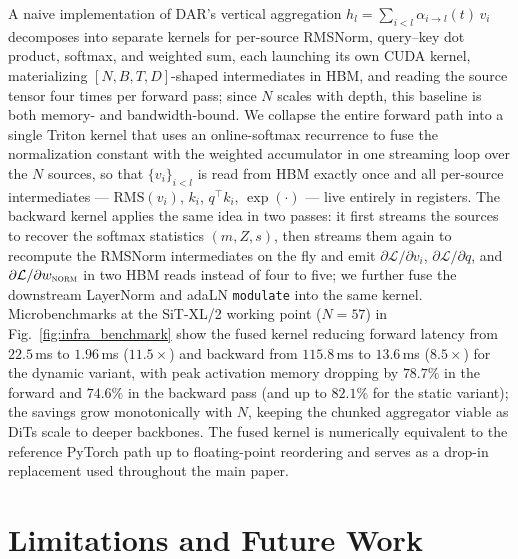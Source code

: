 \documentclass[]{ant_tech_report}
\begin{document}
A naive implementation of \textsc{DAR}'s vertical aggregation $h_l = \sum_{i<l} \alpha_{i\to l}(t)\,v_i$ decomposes into separate kernels for per-source RMSNorm, query--key dot product, softmax, and weighted sum, each launching its own CUDA kernel, materializing $[N, B, T, D]$-shaped intermediates in HBM, and reading the source tensor four times per forward pass; since $N$ scales with depth, this baseline is both memory- and bandwidth-bound. We collapse the entire forward path into a single Triton kernel that uses an online-softmax recurrence to fuse the normalization constant with the weighted accumulator in one streaming loop over the $N$ sources, so that $\{v_i\}_{i<l}$ is read from HBM exactly once and all per-source intermediates --- $\mathrm{RMS}(v_i)$, $k_i$, $q^{\top}k_i$, $\exp(\cdot)$ --- live entirely in registers. The backward kernel applies the same idea in two passes: it first streams the sources to recover the softmax statistics $(m, Z, s)$, then streams them again to recompute the RMSNorm intermediates on the fly and emit $\partial\mathcal{L}/\partial v_i$, $\partial\mathcal{L}/\partial q$, and $\partial\mathcal{L}/\partial w_{\textsc{norm}}$ in two HBM reads instead of four to five; we further fuse the downstream LayerNorm and adaLN \texttt{modulate} into the same kernel. Microbenchmarks at the SiT-XL/2 working point ($N=57$) in Fig.~\ref{fig:infra_benchmark} show the fused kernel reducing forward latency from $22.5$\,ms to $1.96$\,ms ($11.5\times$) and backward from $115.8$\,ms to $13.6$\,ms ($8.5\times$) for the dynamic variant, with peak activation memory dropping by $78.7\%$ in the forward and $74.6\%$ in the backward pass (and up to $82.1\%$ for the static variant); the savings grow monotonically with $N$, keeping the chunked aggregator viable as DiTs scale to deeper backbones. The fused kernel is numerically equivalent to the reference PyTorch path up to floating-point reordering and serves as a drop-in replacement used throughout the main paper.

\section{Limitations and Future Work}
\label{limitations}
\end{document}
